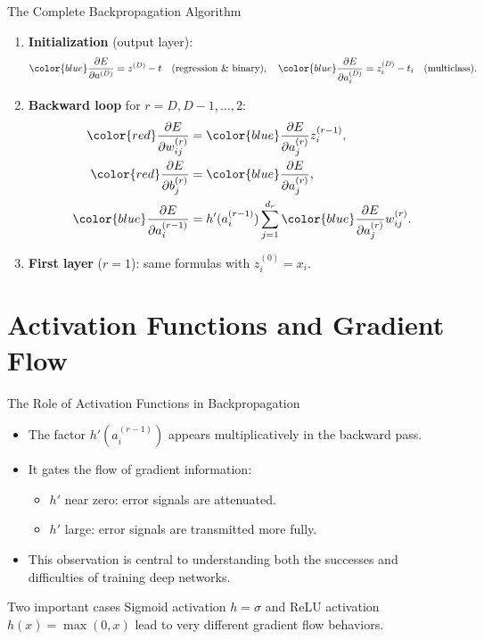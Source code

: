 \begin{frame}{The Complete Backpropagation Algorithm}
  \begin{enumerate}
    \item \textbf{Initialization} (output layer):
    \[
      {\color{blue}\frac{\partial E}{\partial a^{(D)}}} = z^{(D)} - t \quad \text{(regression \& binary)},
      \quad
      {\color{blue}\frac{\partial E}{\partial a_i^{(D)}}} = z_i^{(D)} - t_i \quad \text{(multiclass)}.
    \]
    \item \textbf{Backward loop} for $r = D, D-1, \ldots, 2$:
    \begin{align*}
      {\color{red}\frac{\partial E}{\partial w_{ij}^{(r)}}} &= {\color{blue}\frac{\partial E}{\partial a_j^{(r)}}} z_i^{(r-1)}, \\
      {\color{red}\frac{\partial E}{\partial b_j^{(r)}}} &= {\color{blue}\frac{\partial E}{\partial a_j^{(r)}}}, \\
      {\color{blue}\frac{\partial E}{\partial a_i^{(r-1)}}} &= h'(a_i^{(r-1)}) \sum_{j=1}^{d_r} {\color{blue}\frac{\partial E}{\partial a_j^{(r)}}} w_{ij}^{(r)}.
    \end{align*}
    \item \textbf{First layer} ($r=1$): same formulas with $z_i^{(0)} = x_i$.
  \end{enumerate}
\end{frame}

\section{Activation Functions and Gradient Flow}

\begin{frame}{The Role of Activation Functions in Backpropagation}
  \begin{itemize}
    \item The factor $h'(a_i^{(r-1)})$ appears \alert{multiplicatively} in the backward pass.
    \item It gates the flow of gradient information:
      \begin{itemize}
        \item $h'$ near zero: error signals are \alert{attenuated}.
        \item $h'$ large: error signals are \alert{transmitted more fully}.
      \end{itemize}
    \item This observation is central to understanding both the \alert{successes and difficulties} of training deep networks.
  \end{itemize}
  \begin{block}{Two important cases}
    Sigmoid activation $h=\sigma$ and ReLU activation $h(x)=\max(0,x)$ lead to very different gradient flow behaviors.
  \end{block}
\end{frame}

